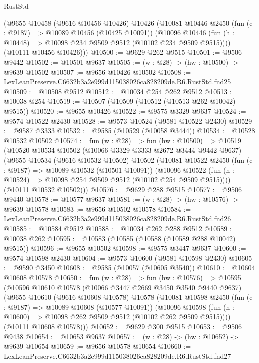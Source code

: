 \begin{lexlean}{RustStd}
\begin{coremodule}
      (@9655
        @10458
        (@9616 @10456 @10426)
        @10426
        (@10081
          @10446
          @2450
          (fun (c : @9187) => @10089 @10456 (@10425 @10091))
          (@10096 @10446 (fun (h : @10448) => @10098 @234 @9509 @9512 (@10102 @234 @9509 @9515))))
        (@10111 @10456 @10426)))
@10500 := @9629 @262 @9515
@10501 := @9506 @9442
@10502 := @10501 @9637
@10505 := (w : @28) -> (hw : @10500) -> @9639 @10502
@10507 := @9656 @10426 @10502
@10508 := LexLeanPreserve.C6632b3a2e999d115038026ca828209de.R6.RustStd.fnd25
@10509 := @10508 @9512
@10512 := @10034 @254 @262 @9512
@10513 := @10038 @254
@10519 := @10507 (@10509 (@10512 (@10513 @262 @10042) @9515))
@10520 := @9655 @10426
@10522 := @9575 @3329 @9637
@10524 := @9574 @10522 @2430
@10528 := @9573 @10524 (@9581 @10522 @2430)
@10529 := @9587 @3333
@10532 := @9585 (@10529 (@10058 @3444))
@10534 := @10528 @10532 @10502
@10574 := fun (w : @28) =>
  fun (hw : @10500) =>
  @10519
    (@10520
      @10534
      @10502
      (@10066 @3329 @3333 @2672 @3444 @9442 @9637)
      (@9655
        @10534
        (@9616 @10532 @10502)
        @10502
        (@10081
          @10522
          @2450
          (fun (c : @9187) => @10089 @10532 (@10501 @10091))
          (@10096 @10522 (fun (h : @10524) => @10098 @254 @9509 @9512 (@10102 @254 @9509 @9515))))
        (@10111 @10532 @10502)))
@10576 := @9629 @288 @9515
@10577 := @9506 @9440
@10578 := @10577 @9637
@10581 := (w : @28) -> (hw : @10576) -> @9639 @10578
@10583 := @9656 @10502 @10578
@10584 := LexLeanPreserve.C6632b3a2e999d115038026ca828209de.R6.RustStd.fnd26
@10585 := @10584 @9512
@10588 := @10034 @262 @288 @9512
@10589 := @10038 @262
@10595 := @10583 (@10585 (@10588 (@10589 @288 @10042) @9515))
@10596 := @9655 @10502
@10598 := @9575 @3447 @9637
@10600 := @9574 @10598 @2430
@10604 := @9573 @10600 (@9581 @10598 @2430)
@10605 := @9590 @3450
@10608 := @9585 (@10057 (@10605 @3540))
@10610 := @10604 @10608 @10578
@10650 := fun (w : @28) =>
  fun (hw : @10576) =>
  @10595
    (@10596
      @10610
      @10578
      (@10066 @3447 @2669 @3450 @3540 @9440 @9637)
      (@9655
        @10610
        (@9616 @10608 @10578)
        @10578
        (@10081
          @10598
          @2450
          (fun (c : @9187) => @10089 @10608 (@10577 @10091))
          (@10096 @10598 (fun (h : @10600) => @10098 @262 @9509 @9512 (@10102 @262 @9509 @9515))))
        (@10111 @10608 @10578)))
@10652 := @9629 @300 @9515
@10653 := @9506 @9438
@10654 := @10653 @9637
@10657 := (w : @28) -> (hw : @10652) -> @9639 @10654
@10659 := @9656 @10578 @10654
@10660 := LexLeanPreserve.C6632b3a2e999d115038026ca828209de.R6.RustStd.fnd27

\end{coremodule}
\end{lexlean}
